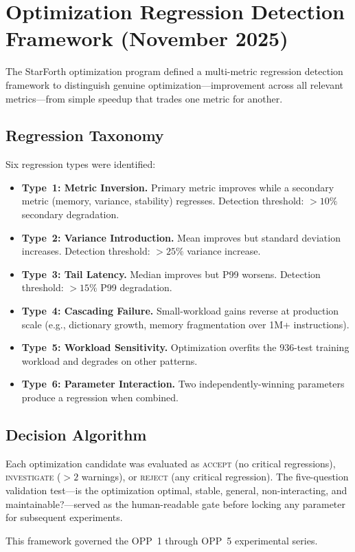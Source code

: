
\section*{Optimization Regression Detection Framework (November 2025)}

The StarForth optimization program defined a multi-metric regression detection
framework to distinguish genuine optimization---improvement across all relevant
metrics---from simple speedup that trades one metric for another.

\subsection*{Regression Taxonomy}

Six regression types were identified:

\begin{itemize}
  \item \textbf{Type~1: Metric Inversion.} Primary metric improves while a
        secondary metric (memory, variance, stability) regresses. Detection
        threshold: $>10\%$ secondary degradation.
  \item \textbf{Type~2: Variance Introduction.} Mean improves but standard
        deviation increases. Detection threshold: $>25\%$ variance increase.
  \item \textbf{Type~3: Tail Latency.} Median improves but P99 worsens.
        Detection threshold: $>15\%$ P99 degradation.
  \item \textbf{Type~4: Cascading Failure.} Small-workload gains reverse at
        production scale (e.g., dictionary growth, memory fragmentation over
        1M+ instructions).
  \item \textbf{Type~5: Workload Sensitivity.} Optimization overfits the
        936-test training workload and degrades on other patterns.
  \item \textbf{Type~6: Parameter Interaction.} Two independently-winning
        parameters produce a regression when combined.
\end{itemize}

\subsection*{Decision Algorithm}

Each optimization candidate was evaluated as \textsc{accept} (no critical
regressions), \textsc{investigate} ($>2$ warnings), or \textsc{reject} (any
critical regression). The five-question validation test---is the optimization
optimal, stable, general, non-interacting, and maintainable?---served as the
human-readable gate before locking any parameter for subsequent experiments.

This framework governed the OPP~1 through OPP~5 experimental series.
